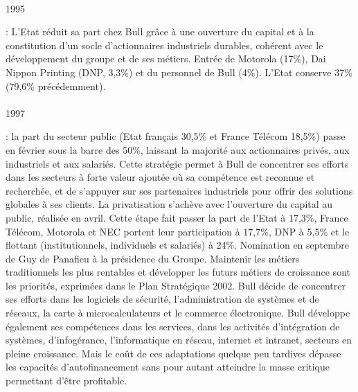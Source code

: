 \documentclass{article}
\begin{document}
		\paragraph{}
		\begin{bf}1995\end{bf}: L’Etat réduit sa part chez Bull grâce à une ouverture du capital et à la constitution d’un 
		socle d’actionnaires industriels durables, cohérent avec le développement du groupe et de ses métiers. Entrée de 
		Motorola (17\%), Dai Nippon Printing (DNP, 3,3\%) et du personnel de Bull (4\%). L’Etat conserve 37\% (79,6\% 
		précédemment).
		\paragraph{}
		\begin{bf}1997\end{bf}: la part du secteur public (Etat français 30,5\% et France Télécom 18,5\%) passe en février 
		sous la barre des 50\%, laissant la majorité aux actionnaires privés, aux industriels et aux salariés. Cette stratégie 
		permet à Bull de concentrer ses efforts dans les secteurs à forte valeur ajoutée où sa compétence est reconnue et 
		recherchée, et de s’appuyer sur ses partenaires industriels pour offrir des solutions globales à ses clients.\newline{}
		La privatisation s’achève avec l’ouverture du capital au public, réalisée en avril. Cette étape fait passer la part de 
		l’Etat à 17,3\%, France Télécom, Motorola et NEC portent leur participation à 17,7\%, DNP à 5,5\% et le flottant 
		(institutionnels, individuels et salariés) à 24\%.\newline{}
		Nomination en septembre de Guy de Panafieu à la présidence du Groupe. Maintenir les métiers traditionnels les plus 
		rentables et développer les futurs métiers de croissance sont les priorités, exprimées dans le Plan Stratégique 2002. 
		Bull décide de concentrer ses efforts dans les logiciels de sécurité, l’administration de systèmes et de réseaux, 
		la carte à microcalculateurs et le commerce électronique.\newline{}
		Bull développe également ses compétences dans les services, dans les activités d’intégration de systèmes, 
		d’infogérance, l’informatique en réseau, internet et intranet, secteurs en pleine croissance. Mais le coût de ces 
		adaptations quelque peu tardives dépasse les capacités d’autofinancement sans pour autant atteindre la masse critique 
		permettant d’être profitable. \newline{}
\end{document}
